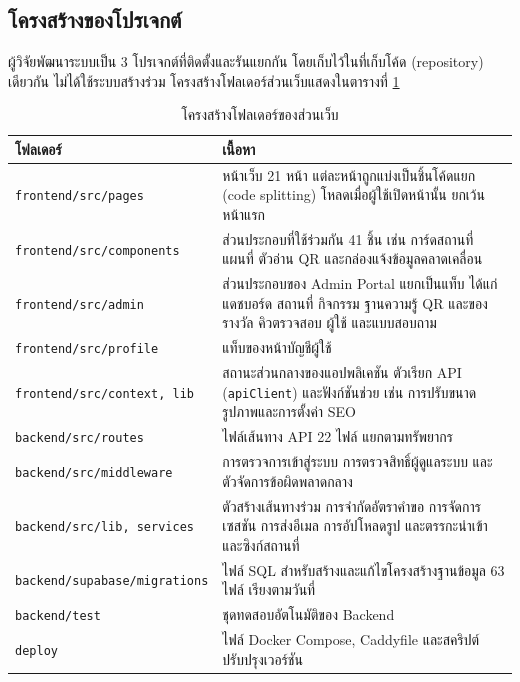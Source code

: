 \subsection{โครงสร้างของโปรเจกต์}

ผู้วิจัยพัฒนาระบบเป็น 3 โปรเจกต์ที่ติดตั้งและรันแยกกัน โดยเก็บไว้ในที่เก็บโค้ด (repository) เดียวกัน ไม่ได้ใช้ระบบสร้างร่วม โครงสร้างโฟลเดอร์ส่วนเว็บแสดงในตารางที่ \ref{tab:folder_structure}

\begin{table}[H]
\centering
\caption{โครงสร้างโฟลเดอร์ของส่วนเว็บ}
\label{tab:folder_structure}
\begin{tabular}{|p{5.2cm}|p{7.4cm}|}
\hline
\textbf{โฟลเดอร์} & \textbf{เนื้อหา} \\
\hline
\texttt{frontend/src/pages} & หน้าเว็บ 21 หน้า แต่ละหน้าถูกแบ่งเป็นชิ้นโค้ดแยก (code splitting) โหลดเมื่อผู้ใช้เปิดหน้านั้น ยกเว้นหน้าแรก \\ \hline
\texttt{frontend/src/components} & ส่วนประกอบที่ใช้ร่วมกัน 41 ชิ้น เช่น การ์ดสถานที่ แผนที่ ตัวอ่าน QR และกล่องแจ้งข้อมูลคลาดเคลื่อน \\ \hline
\texttt{frontend/src/admin} & ส่วนประกอบของ Admin Portal แยกเป็นแท็บ ได้แก่ แดชบอร์ด สถานที่ กิจกรรม ฐานความรู้ QR และของรางวัล คิวตรวจสอบ ผู้ใช้ และแบบสอบถาม \\ \hline
\texttt{frontend/src/profile} & แท็บของหน้าบัญชีผู้ใช้ \\ \hline
\texttt{frontend/src/context, lib} & สถานะส่วนกลางของแอปพลิเคชัน ตัวเรียก API (\texttt{apiClient}) และฟังก์ชันช่วย เช่น การปรับขนาดรูปภาพและการตั้งค่า SEO \\ \hline
\texttt{backend/src/routes} & ไฟล์เส้นทาง API 22 ไฟล์ แยกตามทรัพยากร \\ \hline
\texttt{backend/src/middleware} & การตรวจการเข้าสู่ระบบ การตรวจสิทธิ์ผู้ดูแลระบบ และตัวจัดการข้อผิดพลาดกลาง \\ \hline
\texttt{backend/src/lib, services} & ตัวสร้างเส้นทางร่วม การจำกัดอัตราคำขอ การจัดการเซสชัน การส่งอีเมล การอัปโหลดรูป และตรรกะนำเข้าและซิงก์สถานที่ \\ \hline
\texttt{backend/supabase/migrations} & ไฟล์ SQL สำหรับสร้างและแก้ไขโครงสร้างฐานข้อมูล 63 ไฟล์ เรียงตามวันที่ \\ \hline
\texttt{backend/test} & ชุดทดสอบอัตโนมัติของ Backend \\ \hline
\texttt{deploy} & ไฟล์ Docker Compose, Caddyfile และสคริปต์ปรับปรุงเวอร์ชัน \\
\hline
\end{tabular}
\end{table}


